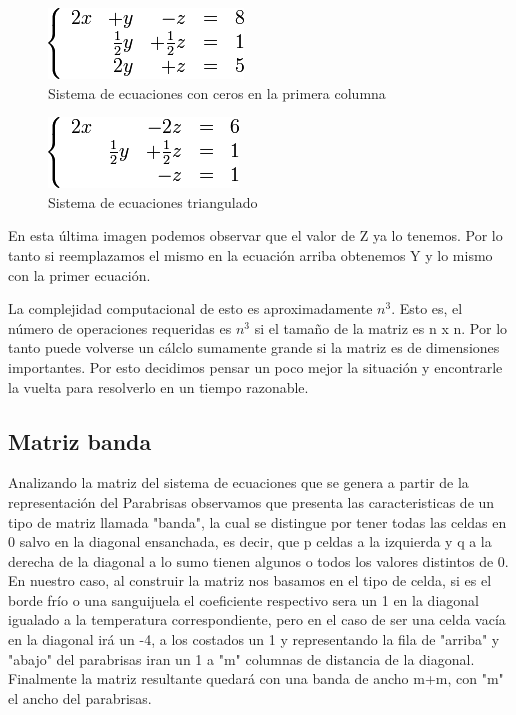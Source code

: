 \begin{figure}[htb]
\begin{center}
\includegraphics[scale=0.70]{imagenes/ejemplo_gaus_2.png} 
\caption{Sistema de ecuaciones con ceros en la primera columna} 
\end{center}
\end{figure}

\begin{figure}[htb]
\begin{center}
\includegraphics[scale=0.70]{imagenes/ejemplo_gaus_3.png} 
\caption{Sistema de ecuaciones triangulado} 
\end{center}
\end{figure}
\newpage
En esta última imagen podemos observar que el valor de Z ya lo tenemos. Por lo tanto si reemplazamos el mismo en la ecuación arriba obtenemos Y y lo mismo con la primer ecuación.

La complejidad computacional de esto es aproximadamente $n^3$. Esto es, el número de operaciones requeridas es $n^3$ si el tamaño de la matriz es n x n. Por lo tanto puede volverse un cálclo sumamente grande si la matriz es de dimensiones importantes. Por esto decidimos pensar un poco mejor la situación y encontrarle la vuelta para resolverlo en un tiempo razonable. 

\subsection{Matriz banda}

Analizando la matriz del sistema de ecuaciones que se genera a partir de la representación del Parabrisas observamos que presenta las caracteristicas de un tipo de matriz llamada "banda", la cual se distingue por tener todas las celdas en 0 salvo en la diagonal ensanchada, es decir, que p celdas a la izquierda y q a la derecha de la diagonal a lo sumo tienen algunos o todos los valores distintos de 0. En nuestro caso, al construir la matriz nos basamos en el tipo de celda, si es el borde frío o una sanguijuela el coeficiente respectivo sera un 1 en la diagonal igualado a la temperatura correspondiente, pero en el caso de ser una celda vacía en la diagonal irá un -4, a los costados un 1 y representando la fila de "arriba" y "abajo" del parabrisas iran un 1 a "m" columnas de distancia de la diagonal. Finalmente la matriz resultante quedará con una banda de ancho m+m, con "m" el ancho del parabrisas.






